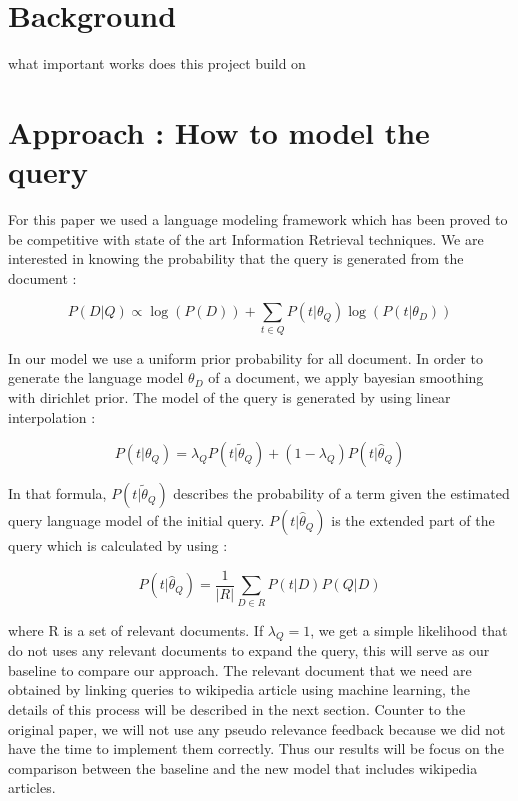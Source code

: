 \documentclass[sigconf]{acmart}
\begin{document}
\section{Background}
what important works does this project build on



\section{Approach : How to model the query}

For this paper we used a language modeling framework which has been proved to be competitive with state of the art Information Retrieval techniques. We are interested in knowing the probability that the query is generated from the document :

\begin{equation}
  P(D|Q) \propto \log(P(D)) + \sum_{t\in Q} P(t | \theta_Q) \log(P(t|\theta_D)) 
\end{equation}

In our model we use a uniform prior probability for all document. In order to generate the language model $\theta_D$ of a document, we apply bayesian smoothing with dirichlet prior. The model of the query is generated by using linear interpolation :

\begin{equation}
  P(t | \theta_Q) = \lambda_Q P(t | \tilde{\theta}_Q) + (1 - \lambda_Q) P(t | \hat{\theta}_Q)
\end{equation}

In that formula, $P(t | \tilde{\theta}_Q)$ describes the probability of a term given the estimated query language model of the initial query. $P(t | \hat{\theta}_Q)$ is the extended part of the query which is calculated by using :

\begin{equation}
  P(t | \hat{\theta}_Q) = \frac{1}{|R|} \sum_{D \in R} P(t | D) P(Q | D)  
\end{equation}

where R is a set of relevant documents. If $\lambda_Q = 1$, we get a simple likelihood that do not uses any relevant documents to expand the query, this will serve as our baseline to compare our approach. The relevant document that we need are obtained by linking queries to wikipedia article using machine learning, the details of this process will be described in the next section. Counter to the original paper, we will not use any pseudo relevance feedback because we did not have the time to implement them correctly. Thus our results will be focus on the comparison between the baseline and the new model that includes wikipedia articles.
\end{document}
